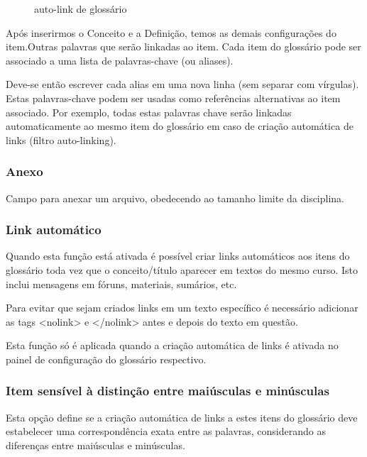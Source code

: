 \begin{figure}[htbp]
 \begin{center}
  \caption{auto-link de glossário}
  \label{fig:cap5_52}
 \end{center}
\end{figure}
Após inserirmos o Conceito e a Definição, temos as demais configurações do item.Outras palavras que serão linkadas ao item. Cada item do glossário pode ser associado a uma lista de palavras-chave (ou aliases).

Deve-se então escrever cada alias em uma nova linha (sem separar com vírgulas). Estas palavras-chave podem ser usadas como referências alternativas ao item associado. Por exemplo, todas estas palavras chave serão linkadas automaticamente ao mesmo item do glossário em caso de criação automática de links (filtro auto-linking).

\subsubsection{Anexo}
Campo para anexar um arquivo, obedecendo ao tamanho limite da disciplina.
\subsubsection{Link automático}
Quando esta função está ativada é possível criar links automáticos aos itens do glossário toda vez que o conceito/título aparecer em textos do mesmo curso. Isto inclui mensagens em fóruns, materiais, sumários, etc.

Para evitar que sejam criados links em um texto específico é necessário adicionar as tags <nolink> e </nolink> antes e depois do texto em questão.

Esta função só é aplicada quando a criação automática de links é ativada no painel de configuração do glossário respectivo.

\subsubsection{Item sensível à distinção entre maiúsculas e minúsculas}
Esta opção define se a criação automática de links a estes itens do glossário deve estabelecer uma correspondência exata entre as palavras, considerando as diferenças entre maiúsculas e minúsculas.

